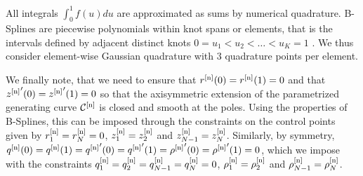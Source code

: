 {All integrals $\int_0^1 f(u) du$ are approximated as sums by numerical quadrature. B-Splines are piecewise polynomials within knot spans or elements, that is the intervals defined by adjacent distinct knots $0 = u_1< u_2 < \ldots < u_K = 1$ \cite{piegl1996}. We thus consider element-wise Gaussian quadrature with $3$ quadrature points per element.

We finally note, that we need to ensure that $r^{[\textup{n}]}(0) = r^{[\textup{n}]}(1) =0$ and that ${z^{[\textup{n}]}}'(0) = {z^{[\textup{n}]}}'(1) =0$ so that the  axisymmetric extension of the parametrized generating curve $\mathcal{C}^{[\textup{n}]}$ is closed and smooth at the poles. Using the properties of B-Splines, this can be imposed through the constraints on the control points given by $r_1^{[\textup{n}]} = r_N^{[\textup{n}]} = 0$, $z_1^{[\textup{n}]} = z_2^{[\textup{n}]}$ and $z_{N-1}^{[\textup{n}]} = z_N^{[\textup{n}]}$. Similarly, by symmetry, $q^{[\textup{n}]}(0) = q^{[\textup{n}]}(1) = {q^{[\textup{n}]}}'(0) = {q^{[\textup{n}]}}'(1)= {\rho^{[\textup{n}]}}'(0) = {\rho^{[\textup{n}]}}'(1) =0$, which we impose with the constraints $q_1^{[\textup{n}]} = q_2^{[\textup{n}]} =q_{N-1}^{[\textup{n}]} = q_N^{[\textup{n}]} = 0$, $\rho_1^{[\textup{n}]} = \rho_2^{[\textup{n}]}$ and $\rho_{N-1}^{[\textup{n}]} = \rho_N^{[\textup{n}]}$.


}
